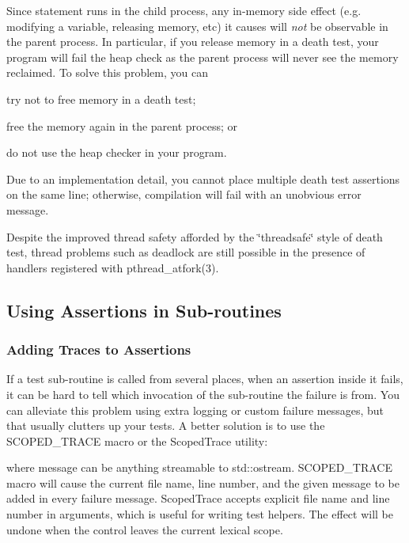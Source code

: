 Since {\ttfamily statement} runs in the child process, any in-\/memory side effect (e.\+g. modifying a variable, releasing memory, etc) it causes will {\itshape not} be observable in the parent process. In particular, if you release memory in a death test, your program will fail the heap check as the parent process will never see the memory reclaimed. To solve this problem, you can


\begin{DoxyEnumerate}
\item try not to free memory in a death test;
\item free the memory again in the parent process; or
\item do not use the heap checker in your program.
\end{DoxyEnumerate}

Due to an implementation detail, you cannot place multiple death test assertions on the same line; otherwise, compilation will fail with an unobvious error message.

Despite the improved thread safety afforded by the \char`\"{}threadsafe\char`\"{} style of death test, thread problems such as deadlock are still possible in the presence of handlers registered with {\ttfamily pthread\+\_\+atfork(3)}.

\subsection*{Using Assertions in Sub-\/routines}

\subsubsection*{Adding Traces to Assertions}

If a test sub-\/routine is called from several places, when an assertion inside it fails, it can be hard to tell which invocation of the sub-\/routine the failure is from. You can alleviate this problem using extra logging or custom failure messages, but that usually clutters up your tests. A better solution is to use the {\ttfamily S\+C\+O\+P\+E\+D\+\_\+\+T\+R\+A\+CE} macro or the {\ttfamily Scoped\+Trace} utility\+:


\begin{DoxyCode}{0}
\end{DoxyCode}


where {\ttfamily message} can be anything streamable to {\ttfamily std\+::ostream}. {\ttfamily S\+C\+O\+P\+E\+D\+\_\+\+T\+R\+A\+CE} macro will cause the current file name, line number, and the given message to be added in every failure message. {\ttfamily Scoped\+Trace} accepts explicit file name and line number in arguments, which is useful for writing test helpers. The effect will be undone when the control leaves the current lexical scope.

